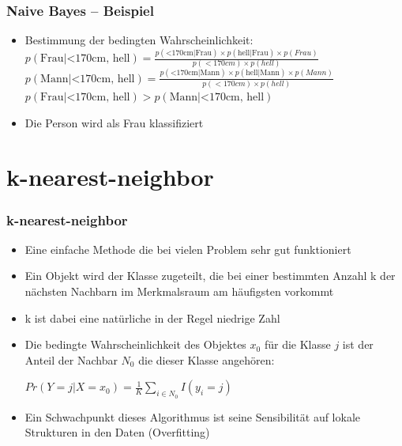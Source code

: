 \documentclass{beamer}
\begin{document}
\begin{frame}
  \frametitle{Naive Bayes -- Beispiel}  
  \begin{itemize}
  \item Bestimmung der bedingten Wahrscheinlichkeit:
\vspace{.4cm}  
\newline 
\vspace{.4cm}
  $p(\text{Frau}|\text{<170cm, hell}) = \frac{p(\text{<170cm}|\text{Frau}) \times p(\text{hell}|\text{Frau}) \times p(Frau)}{p(<170cm) \times p(hell)}$
 \newline 
 \vspace{.4cm}
  $p(\text{Mann}|\text{<170cm, hell}) = \frac{p(\text{<170cm}|\text{Mann}) \times p(\text{hell}|\text{Mann}) \times p(Mann)}{p(<170cm) \times p(hell)}$
\newline 
\vspace{.4cm}
    $p(\text{Frau}|\text{<170cm, hell}) > p(\text{Mann}|\text{<170cm, hell})$
  \item Die Person wird als Frau klassifiziert
  \end{itemize}  
\end{frame}

\section{k-nearest-neighbor}

\begin{frame}
  \frametitle{k-nearest-neighbor}  
  \begin{itemize}
  \item Eine einfache Methode die bei vielen Problem sehr gut funktioniert
  \item Ein Objekt wird der Klasse zugeteilt, die bei einer bestimmten Anzahl k der nächsten Nachbarn im Merkmalsraum am häufigsten vorkommt
  \item k ist dabei eine natürliche in der Regel niedrige Zahl
  \item Die bedingte Wahrscheinlichkeit des Objektes $x_{0}$ für die Klasse $j$ ist der Anteil der Nachbar $N_{0}$ die dieser Klasse angehören:
  \newline
\begin{center}
    $Pr(Y=j|X=x_{0}) = \frac{1}{K}\sum\limits_{i \in N_{0}}I(y_{i}=j) $
  \end{center}  
  \item Ein Schwachpunkt dieses Algorithmus ist seine Sensibilität auf lokale Strukturen in den Daten (Overfitting)
  \end{itemize}  
\end{frame}
\end{document}
